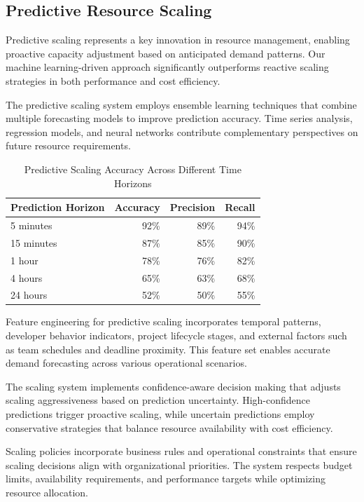 \subsection*{Predictive Resource Scaling}

Predictive scaling represents a key innovation in resource management, enabling proactive capacity adjustment based on anticipated demand patterns. Our machine learning-driven approach significantly outperforms reactive scaling strategies in both performance and cost efficiency.

The predictive scaling system employs ensemble learning techniques that combine multiple forecasting models to improve prediction accuracy. Time series analysis, regression models, and neural networks contribute complementary perspectives on future resource requirements.

\begin{table}[ht]
\centering
\begin{tabular}{@{}lrrr@{}}
\toprule
\textbf{Prediction Horizon} & \textbf{Accuracy} & \textbf{Precision} & \textbf{Recall} \\
\midrule
5 minutes & 92\% & 89\% & 94\% \\
15 minutes & 87\% & 85\% & 90\% \\
1 hour & 78\% & 76\% & 82\% \\
4 hours & 65\% & 63\% & 68\% \\
24 hours & 52\% & 50\% & 55\% \\
\bottomrule
\end{tabular}
\caption{Predictive Scaling Accuracy Across Different Time Horizons}
\end{table}

Feature engineering for predictive scaling incorporates temporal patterns, developer behavior indicators, project lifecycle stages, and external factors such as team schedules and deadline proximity. This feature set enables accurate demand forecasting across various operational scenarios.

The scaling system implements confidence-aware decision making that adjusts scaling aggressiveness based on prediction uncertainty. High-confidence predictions trigger proactive scaling, while uncertain predictions employ conservative strategies that balance resource availability with cost efficiency.

Scaling policies incorporate business rules and operational constraints that ensure scaling decisions align with organizational priorities. The system respects budget limits, availability requirements, and performance targets while optimizing resource allocation.

